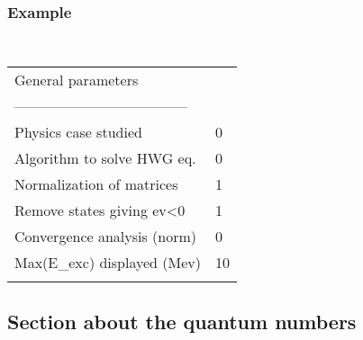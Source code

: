 \documentclass[a4paper,11pt]{article}
\begin{document}
\subsubsection*{Example}
\begin{center}
\tt
\begin{tabular}{|ll|}
\hline
General parameters            &     \\
------------------------------------ & \\
Physics case studied          &0    \\
Algorithm to solve HWG eq.    &0    \\
Normalization of matrices     &1    \\
Remove states giving ev<0     &1    \\
Convergence analysis (norm)   &0    \\
Max(E\_exc) displayed (Mev)   &10   \\
                              &     \\
\hline
\end{tabular}
\end{center}

%
%
\subsection{Section about the quantum numbers}
\end{document}
